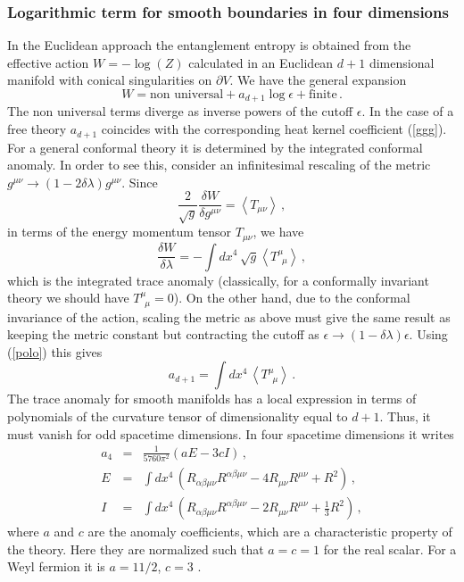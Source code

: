 \documentclass[a4paper]{article}
\begin{document}
\subsubsection{Logarithmic term for smooth boundaries in four dimensions}
In the Euclidean approach the entanglement entropy is obtained from the effective action $W=-\log(Z)$ calculated in an Euclidean $d+1$ dimensional manifold with conical singularities on $\partial V$.  
We have the general expansion 
\begin{equation}
W=\textrm{non universal} +a_{d+1} \log{\epsilon}+\textrm{finite}\,.\label{polo}
\end{equation}
The non universal terms diverge as inverse powers of the cutoff $\epsilon$. In the case of a free theory $a_{d+1}$ coincides with the corresponding heat kernel coefficient (\ref{ggg}). For a general conformal theory it is determined by the integrated conformal anomaly. In order to see this, consider an infinitesimal rescaling of the metric $g^{\mu\nu}\rightarrow(1-2 \delta \lambda)g^{\mu\nu}$. Since 
\begin{equation}
\frac{2}{\sqrt{g}}\frac{\delta W}{\delta g^{\mu\nu}}=\left<T_{\mu\nu}\right>\,,
\end{equation}
in terms of the energy momentum tensor $T_{\mu\nu}$, we have 
\begin{equation}
\frac{\delta W}{\delta \lambda}=-\int dx^4\, \sqrt{g}  \left<T_{\,\,\,\mu}^\mu\right>\,,
\end{equation}
which is the integrated trace anomaly (classically, for a conformally invariant theory we should have $T_{\,\,\,\mu}^\mu=0$). On the other hand, due to the conformal invariance of the action, scaling the metric as above must give the same result as keeping the metric constant but contracting the cutoff as  $\epsilon\rightarrow (1-\delta \lambda)\epsilon$. Using (\ref{polo}) this gives  
\begin{equation}
a_{d+1}= \int dx^4\, \left<T_{\,\,\,\mu}^\mu\right>\,.
\end{equation}  
The trace anomaly for smooth manifolds has a local expression in terms of polynomials of the curvature tensor of dimensionality equal to $d+1$. Thus, it must vanish for odd spacetime dimensions. In four spacetime dimensions it writes \cite{anomalia}
\begin{eqnarray}
a_4&=& \frac{1}{5760 \pi^2} (a E - 3 c  I)\,,\label{gfgf}\\
E&=&\int dx^4\, (R_{\alpha \beta \mu \nu}R^{\alpha \beta \mu \nu}-4 R_{\mu \nu}R^{\mu \nu}+R^2)\,,\\
I&=& \int dx^4\, (R_{\alpha \beta \mu \nu}R^{\alpha \beta \mu \nu}-2 R_{\mu \nu}R^{\mu \nu}+\frac{1}{3} R^2)\,,\label{last}
\end{eqnarray}
where $a$ and $c$ are the anomaly coefficients, which are a characteristic property of the theory. Here they are normalized such that $a=c=1$ for the real scalar. For a Weyl fermion it is $a=11/2$, $c=3$ \cite{anomalia}.
\end{document}
